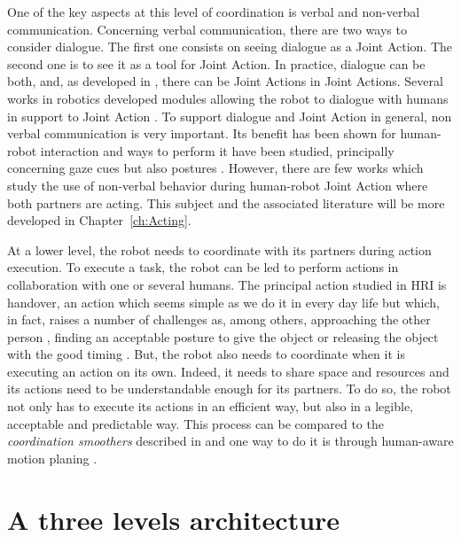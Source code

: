 \documentclass[english,a4paper,11pt,twoside]{StyleThese}
\begin{document}
One of the key aspects at this level of coordination is verbal and non-verbal communication. Concerning verbal communication, there are two ways to consider dialogue. The first one consists on seeing dialogue as a Joint Action. The second one is to see it as a tool for Joint Action. In practice, dialogue can be both, and, as developed in \cite{clark1996using}, there can be Joint Actions in Joint Actions. Several works in robotics developed modules allowing the robot to dialogue with humans in support to Joint Action \cite{roy2000spoken, lucignano2013dialogue, ferreira2015users}. To support dialogue and Joint Action in general, non verbal communication is very important. Its benefit has been shown for human-robot interaction \cite{breazeal2005effects} and ways to perform it have been studied, principally concerning gaze cues \cite{boucher2010facilitative, mutlu2009footing} but also postures \cite{hart2014gesture}. However, there are few works which study the use of non-verbal behavior during human-robot Joint Action where both partners are acting. This subject and the associated literature will be more developed in Chapter~\ref{ch:Acting}.

At a lower level, the robot needs to coordinate with its partners during action execution. To execute a task, the robot can be led to perform actions in collaboration with one or several humans. The principal action studied in HRI is handover, an action which seems simple as we do it in every day life but which, in fact, raises a number of challenges as, among others, approaching the other person \cite{walters2007robotic}, finding an acceptable posture to give the object \cite{cakmak2011human, mainprice2012sharing} or releasing the object with the good timing \cite{mason2005grip}. But, the robot also needs to coordinate when it is executing an action on its own. Indeed, it needs to share space and resources and its actions need to be understandable enough for its partners. To do so, the robot not only has to execute its actions in an efficient way, but also in a legible, acceptable and predictable way. This process can be compared to the \textit{coordination smoothers} described in \cite{vesper2010minimal} and one way to do it is through human-aware motion planing \cite{sisbot2012human, kruse2013human}.


\section{A three levels architecture}
\end{document}
